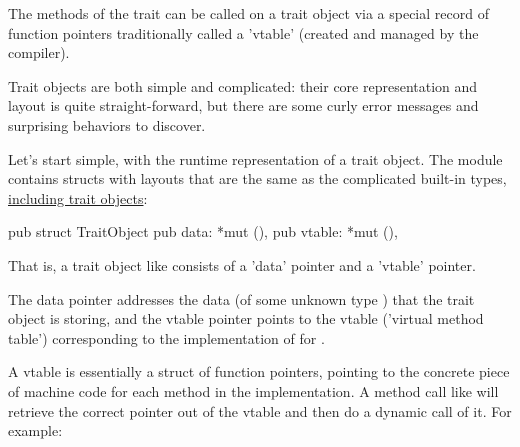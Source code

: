 The methods of the trait can be called on a trait object via a special record of function pointers traditionally called a 'vtable' 
(created and managed by the compiler).

\blank

Trait objects are both simple and complicated: their core representation and layout is quite straight-forward, but there are some curly 
error messages and surprising behaviors to discover.

\blank

Let's start simple, with the runtime representation of a trait object. The  module contains structs with layouts that are 
the same as the complicated built-in types, \href{https://doc.rust-lang.org/std/raw/struct.TraitObject.html}{including trait objects}:

\begin{rustc}
pub struct TraitObject {
    pub data: *mut (),
    pub vtable: *mut (),
}
\end{rustc}

That is, a trait object like  consists of a 'data' pointer and a 'vtable' pointer.

\blank

The data pointer addresses the data (of some unknown type ) that the trait object is storing, and the vtable pointer points to the 
vtable ('virtual method table') corresponding to the implementation of  for .

\blank

A vtable is essentially a struct of function pointers, pointing to the concrete piece of machine code for each method in the implementation. 
A method call like  will retrieve the correct pointer out of the vtable and then do a dynamic call of it. 
For example:

